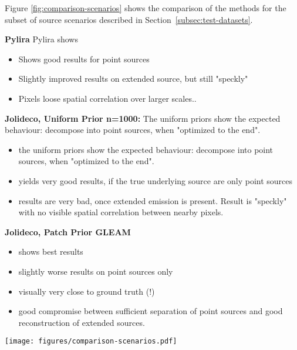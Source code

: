 \documentclass[twocolumn]{aastex631}
\newcommand{\todo}[1]{\textcolor{red}{TODO: #1}\PackageWarning{TODO:}{#1!}}
\begin{document}
    Figure \ref{fig:comparison-scenarios} shows the comparison of the methods for the subset of source scenarios described in Section~\ref{subsec:test-datasets}.

    \par{\textbf{Pylira}}
    Pylira shows 
    \begin{itemize}
        \item Shows good results for point sources
        \item Slightly improved results on extended source, but still "speckly"
        \item Pixels loose spatial correlation over larger scales..
    \end{itemize}

    
    \par{\textbf{Jolideco, Uniform Prior n=1000:}}
    The uniform priors show the expected behaviour: decompose into point sources, when "optimized to the end".
    
    \begin{itemize}
        \item the uniform priors show the expected behaviour: decompose into point sources, when "optimized to the end".
        \item yields very good results, if the true underlying source are only point sources
        \item results are very bad, once extended emission is present. Result is "speckly" with no visible spatial correlation between nearby pixels.
    \end{itemize}

    \par{\textbf{Jolideco, Patch Prior GLEAM}}
    \begin{itemize}
        \item shows best results
        \item slightly worse results on point sources only
        \item visually very close to ground truth (!)
        \item good compromise between sufficient separation of point sources and good reconstruction of extended sources.
    \end{itemize}

    
    
    
    \begin{figure*}
        \begin{centering}
            \texttt{[image: figures/comparison-scenarios.pdf]}
            \caption{
                Comparison of different deconvolution methods for different scenarios. The left column shows the raw simulated data and the second most column from the left the ground truth to comapare to. The simulation used a background level of "bg1 and a Gaussian PSF of \todo{x pixels}. The \textit{Pylira} method uses the \textit{Pylira} method with standard configuration.
                All results are available at \url{https://jolideco.github.io/jolideco-comparison}.
            }
            \label{fig:comparison-scenarios}
        \end{centering}
    \end{figure*}
\end{document}
